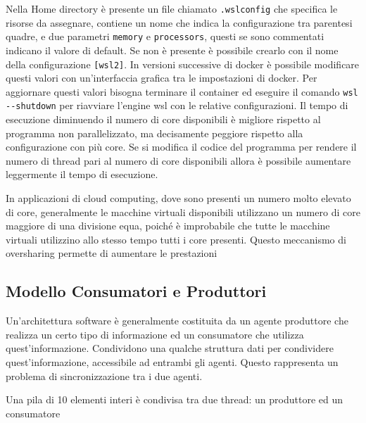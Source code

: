 \documentclass{article}
\numberwithin{equation}{subsection}
\begin{document}
Nella Home directory è presente un file chiamato \verb|.wslconfig| che specifica le risorse da assegnare, contiene un nome che indica la configurazione tra 
parentesi quadre, e due parametri \verb|memory| e \verb|processors|, questi se sono commentati indicano il valore di default. Se non è presente è possibile 
crearlo con il nome della configurazione \verb|[wsl2]|. In versioni successive di docker è possibile modificare questi valori con un'interfaccia grafica 
tra le impostazioni di docker. 
Per aggiornare questi valori bisogna terminare il container ed eseguire il comando \verb|wsl --shutdown| per riavviare l'engine wsl con le relative configurazioni. 
Il tempo di esecuzione diminuendo il numero di core disponibili è migliore rispetto al programma non parallelizzato, ma decisamente peggiore rispetto alla configurazione 
con più core. Se si modifica il codice del programma per rendere il numero di thread pari al numero di core disponibili allora è possibile aumentare leggermente il 
tempo di esecuzione. 

In applicazioni di cloud computing, dove sono presenti un numero molto elevato di core, generalmente le macchine virtuali disponibili utilizzano un numero di core maggiore 
di una divisione equa, poiché è improbabile che tutte le macchine virtuali utilizzino allo stesso tempo tutti i core presenti. Questo meccanismo di oversharing permette 
di aumentare le prestazioni 


\subsection{Modello Consumatori e Produttori}

Un'architettura software è generalmente costituita da un agente produttore che realizza un certo tipo di informazione ed un consumatore che utilizza quest'informazione. 
Condividono una qualche struttura dati per condividere quest'informazione, accessibile ad entrambi gli agenti. Questo rappresenta un problema di sincronizzazione tra 
i due agenti. 

Una pila di 10 elementi interi è condivisa tra due thread: un produttore ed un consumatore
\end{document}
